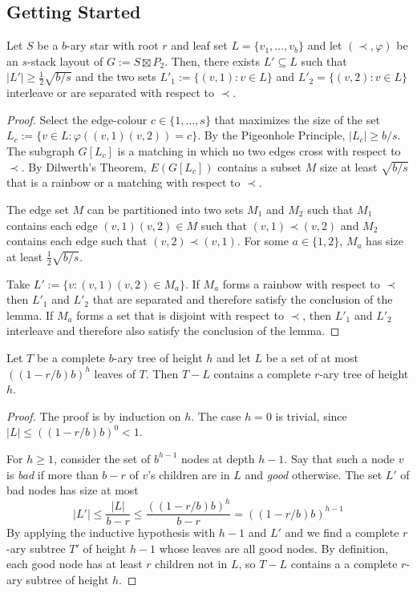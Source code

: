 \documentclass[kpfonts]{patmorin}
\begin{document}
\subsection{Getting Started}

\begin{lem}
  Let $S$ be a $b$-ary star with root $r$ and leaf set $L=\{v_1,\ldots,v_b\}$ and let $(\prec,\varphi)$ be an $s$-stack layout of $G:=S\boxtimes P_2$.  Then, there exists $L'\subseteq L$ such that $|L'|\ge \tfrac{1}{2}\sqrt{b/s}$ and the two sets $L'_1:=\{(v,1):v\in L\}$ and $L'_2=\{(v,2):v\in L\}$ interleave or are separated with respect to $\prec$.  
\end{lem}

\begin{proof}
  Select the edge-colour $c\in\{1,\ldots,s\}$ that maximizes the size of the set $L_c:=\{ v\in L: \varphi((v,1)(v,2))=c\}$.  By the Pigeonhole Principle, $|L_c|\ge b/s$.  The subgraph $G[L_c]$ is a matching in which no two edges cross with respect to $\prec$.  By Dilwerth's Theorem, $E(G[L_c])$ contains a subset $M$ size at least $\sqrt{b/s}$ that is a rainbow or a matching with respect to $\prec$.

  The edge set $M$ can be partitioned into two sets $M_1$ and $M_2$ such that $M_1$ contains each edge $(v,1)(v,2)\in M$ such that $(v,1)\prec (v,2)$ and $M_2$ contains each edge such that $(v,2)\prec (v,1)$.  For some $a\in\{1,2\}$, $M_a$ has size at least $\tfrac{1}{2}\sqrt{b/s}$. 
    
  Take $L':=\{v: (v,1)(v,2)\in M_a\}$.  If $M_a$ forms a rainbow with respect to $\prec$ then $L'_1$ and $L'_2$ that are separated and therefore satisfy the conclusion of the lemma.  If $M_a$ forms a set that is disjoint with respect to $\prec$, then $L'_1$ and $L'_2$ interleave and therefore also satisfy the conclusion of the lemma.
\end{proof}


\begin{lem}
  Let $T$ be a complete $b$-ary tree of height $h$ and let $L$ be a set of at most $((1-r/b)b)^h$ leaves of $T$.  Then $T-L$ contains a complete $r$-ary tree of height $h$. 
\end{lem}

\begin{proof}
  The proof is by induction on $h$.  The case $h=0$ is trivial, since $|L|\le ((1-r/b)b)^0<1$.
  
  For $h\ge 1$, consider the set of $b^{h-1}$ nodes at depth $h-1$.  Say that such a node $v$ is \emph{bad} if more than $b-r$ of $v$'s children are in $L$ and \emph{good} otherwise.  The set $L'$ of bad nodes has size at most
  \[  |L'|\le \frac{|L|}{b-r} \le \frac{((1-r/b)b)^h}{b-r} = ((1-r/b)b)^{h-1} \]
  By applying the inductive hypothesis with $h-1$ and $L'$ and we find a complete $r$-ary subtree $T'$ of height $h-1$ whose leaves are all good nodes.  By definition, each good node has at least $r$ children not in $L$, so $T-L$ contains a a complete $r$-ary subtree of height $h$.
\end{proof}  
\end{document}
